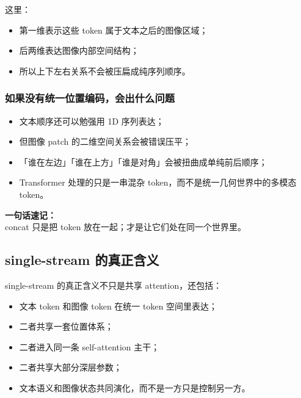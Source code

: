 这里：

\begin{itemize}[leftmargin=1.5em]
  \item 第一维表示这些 token 属于文本之后的图像区域；
  \item 后两维表达图像内部空间结构；
  \item 所以上下左右关系不会被压扁成纯序列顺序。
\end{itemize}

\subsubsection{如果没有统一位置编码，会出什么问题}

\begin{itemize}[leftmargin=1.5em]
  \item 文本顺序还可以勉强用 1D 序列表达；
  \item 但图像 patch 的二维空间关系会被错误压平；
  \item 「谁在左边」「谁在上方」「谁是对角」会被扭曲成单纯前后顺序；
  \item Transformer 处理的只是一串混杂 token，而不是统一几何世界中的多模态 token。
\end{itemize}

\begin{summarybox}
\textbf{一句话速记：}\\
concat 只是把 token 放在一起；才是让它们处在同一个世界里。
\end{summarybox}

\subsection{single-stream 的真正含义}

single-stream 的真正含义不只是共享 attention，还包括：

\begin{itemize}[leftmargin=1.5em]
  \item 文本 token 和图像 token 在统一 token 空间里表达；
  \item 二者共享一套位置体系；
  \item 二者进入同一条 self-attention 主干；
  \item 二者共享大部分深层参数；
  \item 文本语义和图像状态共同演化，而不是一方只是控制另一方。
\end{itemize}

